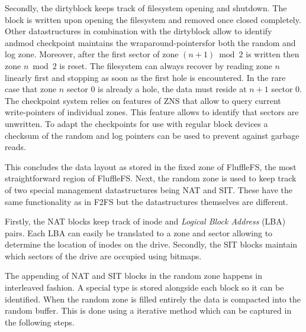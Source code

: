 Secondly, the dirtyblock keeps track of filesystem opening and shutdown. The 
block is written upon opening the filesystem and removed once closed completely.
Other datastructures in combination with the dirtyblock allow to identify andmod
checkpoint maintains the wraparound-pointers\footnotemark[12] for both the random
and log zone. Moreover, after the first sector of zone $(n+1) \bmod{2}$ is
written then zone $n \bmod{2}$ is reset. The filesystem can always recover by
reading zone $n$ linearly first and stopping as soon as the first hole is
encountered. In the rare case that zone $n$ sector $0$ is already a hole, the
data must reside at $n+1$ sector $0$. The checkpoint system relies on features
of ZNS that allow to query current write-pointers of individual zones. This
feature allows to identify that sectors are unwritten. To adapt the checkpoints
for use with regular block devices a checksum of the random and log pointers can
be used to prevent against garbage reads.


This concludes the data layout as stored in the fixed zone of FluffleFS, the
most straightforward region of FluffleFS. Next, the random zone is used to keep
track of two special management datastructures being NAT and SIT. These have the
same functionality as in F2FS but the datastructures themselves are different.

Firstly, the NAT blocks keep track of inode and \textit{Logical Block Address}
(LBA) pairs. Each LBA can easily be translated to a zone and sector allowing to
determine the location of inodes on the drive. Secondly, the SIT blocks
maintain which sectors of the drive are occupied using bitmaps.

The appending of NAT and SIT blocks in the random zone happens in interleaved
fashion. A special type is stored alongside each block so it can be identified.
When the random zone is filled entirely the data is compacted into the random
buffer. This is done using a iterative method which can be captured in the
following steps.


